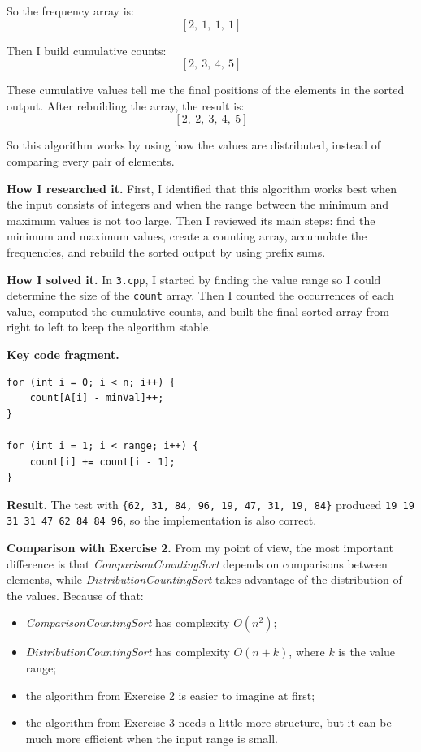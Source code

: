 \documentclass[12pt,a4paper]{article}
\begin{document}
So the frequency array is:
\[
[2,\ 1,\ 1,\ 1]
\]

Then I build cumulative counts:
\[
[2,\ 3,\ 4,\ 5]
\]

These cumulative values tell me the final positions of the elements in the sorted output. After rebuilding the array, the result is:
\[
[2,\ 2,\ 3,\ 4,\ 5]
\]

So this algorithm works by using how the values are distributed, instead of comparing every pair of elements.

\textbf{How I researched it.} First, I identified that this algorithm works best when the input consists of integers and when the range between the minimum and maximum values is not too large. Then I reviewed its main steps: find the minimum and maximum values, create a counting array, accumulate the frequencies, and rebuild the sorted output by using prefix sums.

\textbf{How I solved it.} In \texttt{3.cpp}, I started by finding the value range so I could determine the size of the \texttt{count} array. Then I counted the occurrences of each value, computed the cumulative counts, and built the final sorted array from right to left to keep the algorithm stable.

\textbf{Key code fragment.}
\begin{lstlisting}
for (int i = 0; i < n; i++) {
    count[A[i] - minVal]++;
}

for (int i = 1; i < range; i++) {
    count[i] += count[i - 1];
}
\end{lstlisting}

\textbf{Result.} The test with \texttt{\{62, 31, 84, 96, 19, 47, 31, 19, 84\}} produced \texttt{19 19 31 31 47 62 84 84 96}, so the implementation is also correct.

\textbf{Comparison with Exercise 2.} From my point of view, the most important difference is that \textit{ComparisonCountingSort} depends on comparisons between elements, while \textit{DistributionCountingSort} takes advantage of the distribution of the values. Because of that:

\begin{itemize}
\item \textit{ComparisonCountingSort} has complexity \(O(n^2)\);
\item \textit{DistributionCountingSort} has complexity \(O(n + k)\), where \(k\) is the value range;
\item the algorithm from Exercise 2 is easier to imagine at first;
\item the algorithm from Exercise 3 needs a little more structure, but it can be much more efficient when the input range is small.
\end{itemize}
\end{document}
